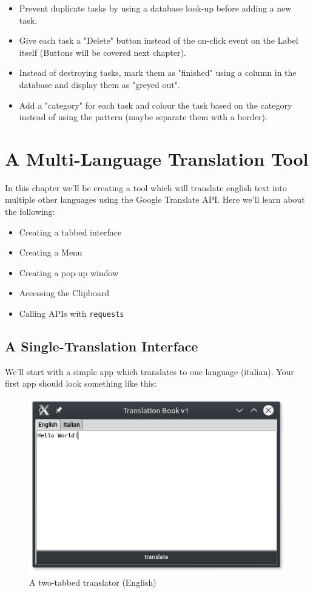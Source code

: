 \documentclass[a4paper,11pt,openany]{book}
\begin{document}
\begin{itemize}
  \item Prevent duplicate tasks by using a database look-up before adding a new task.
  \item Give each task a "Delete" button instead of the on-click event on the Label itself (Buttons will be covered next chapter).
  \item Instead of destroying tasks, mark them as "finished" using a column in the database and display them as "greyed out". 
  \item Add a "category" for each task and colour the task based on the category instead of using the pattern (maybe separate them with a border).
\end{itemize} 

\chapter{A Multi-Language Translation Tool}

In this chapter we'll be creating a tool which will translate english text into multiple other languages using the Google Translate API. Here we'll learn about the following:

\begin{itemize}
  \item Creating a tabbed interface
  \item Creating a Menu
  \item Creating a pop-up window
  \item Accessing the Clipboard 
  \item Calling APIs with \lstinline[columns=fixed]{requests}
\end{itemize} 

\section{A Single-Translation Interface}

We'll start with a simple app which translates to one language (italian). Your first app should look something like this:

\begin{figure}[h]
\centering
\includegraphics{Ch3-1-1}
\caption{A two-tabbed translator (English)}
\end{figure}
\end{document}
